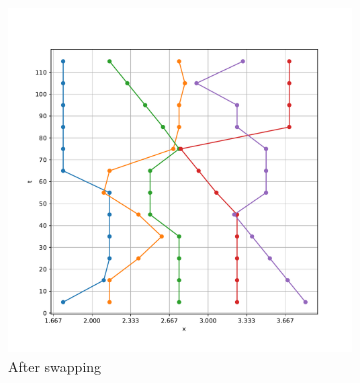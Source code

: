 \documentclass[12pt]{article}
\theoremstyle{definition}
\begin{document}
\begin{figure}
\begin{subfigure}[t]{0.49\textwidth}
    \includegraphics[width=\textwidth]{graph-swap-big-example-swap.pdf}
    \caption{After swapping}
    \label{fig:graph-swap-big-example-swap}
  \end{subfigure}
  \caption{}
  \label{fig:graph-swap-big-example}
\end{figure}
\end{document}
